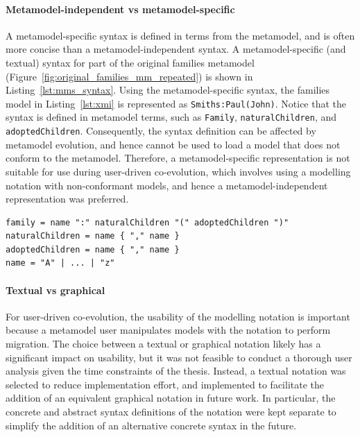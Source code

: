 \paragraph{Metamodel-independent vs metamodel-specific} A metamodel-specific syntax is defined in terms from the metamodel, and is often more concise than a metamodel-independent syntax. A metamodel-specific (and textual) syntax for part of the original families metamodel (Figure~\ref{fig:original_families_mm_repeated}) is shown in Listing~\ref{lst:mms_syntax}. Using the metamodel-specific syntax, the families model in Listing~\ref{lst:xmi} is represented as \texttt{Smiths:Paul(John)}. Notice that the syntax is defined in metamodel terms, such as \texttt{Fa\-mi\-ly}, \texttt{na\-tu\-ralCh\-il\-dr\-en}, and \texttt{ad\-op\-tedCh\-il\-dr\-en}. Consequently, the syntax definition can be affected by metamodel evolution, and hence cannot be used to load a model that does not conform to the metamodel. Therefore, a metamodel-specific representation is not suitable for use during user-driven co-evolution, which involves using a modelling notation with non-conformant models, and hence a metamodel-independent representation was preferred.

\begin{lstlisting}[caption=A metamodel-specific syntax for families in EBNF, label=lst:mms_syntax, language=EBNF]
family = name ":" naturalChildren "(" adoptedChildren ")"
naturalChildren = name { "," name }
adoptedChildren = name { "," name }
name = "A" | ... | "z"
\end{lstlisting}

\paragraph{Textual vs graphical} For user-driven co-evolution, the usability of the modelling notation is important because a metamodel user manipulates models with the notation to perform migration. The choice between a textual or graphical notation likely has a significant impact on usability, but it was not feasible to conduct a thorough user analysis given the time constraints of the thesis. Instead, a textual notation was selected to reduce implementation effort, and implemented to facilitate the addition of an equivalent graphical notation in future work. In particular, the concrete and abstract syntax definitions of the notation were kept separate to simplify the addition of an alternative concrete syntax in the future.

